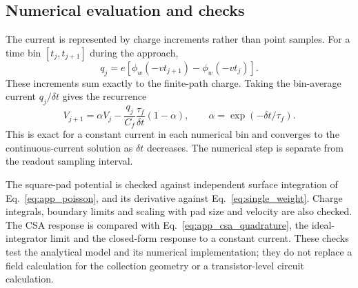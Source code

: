 \documentclass[pdflatex,iicol,sn-mathphys-num]{sn-jnl}
\begin{document}
\subsection{Numerical evaluation and checks}

The current is represented by charge increments rather than point samples. For a time bin $[t_j,t_{j+1}]$ during the approach,
\begin{equation}
 q_j=e[\phi_w(-vt_{j+1})-\phi_w(-vt_j)].
\end{equation}
These increments sum exactly to the finite-path charge. Taking the bin-average current $q_j/\delta t$ gives the recurrence
\begin{equation}
 V_{j+1}=\alpha V_j
 -\frac{q_j}{C_f}\frac{\tau_f}{\delta t}(1-\alpha),
 \qquad \alpha=\exp(-\delta t/\tau_f).
 \label{eq:app_recurrence}
\end{equation}
This is exact for a constant current in each numerical bin and converges to the continuous-current solution as $\delta t$ decreases. The numerical step is separate from the readout sampling interval.

The square-pad potential is checked against independent surface integration of Eq.~\eqref{eq:app_poisson}, and its derivative against Eq.~\eqref{eq:single_weight}. Charge integrals, boundary limits and scaling with pad size and velocity are also checked. The CSA response is compared with Eq.~\eqref{eq:app_csa_quadrature}, the ideal-integrator limit and the closed-form response to a constant current. These checks test the analytical model and its numerical implementation; they do not replace a field calculation for the collection geometry or a transistor-level circuit calculation.







\end{document}

